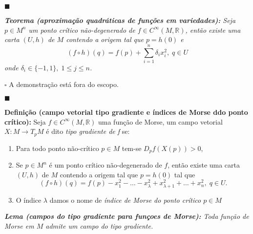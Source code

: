\documentclass{article}
\begin{document}
	$\blacksquare$
	
	\vspace{2mm}
	\textit{\textbf{Teorema (aproximação quadráticas de funções em variedades):} Seja $p \in M^{n}$ um ponto crítico não-degenerado de $f \in C^{\infty}(M, \mathbb{R})$, então existe uma carta $(U, h)$ de $M$ contendo a origem tal que $p = h(0)$ e 
		$$
		(f \circ h) (q) = f(p) + \sum_{i=1}^{n}\delta_{i}x_{i}^{2}, \; q \in U
		$$
		onde $\delta_{i} \in \{-1,1\}, \; 1\leq j \leq n$.}
	
	$\square$ A demonstração está fora do escopo.	
	
	$\blacksquare$
	
	\vspace{2mm}
	\textbf{Definição (campo vetorial tipo gradiente e índices de Morse ddo ponto crítico):} Seja $f \in C^{\infty}(M, \mathbb{R})$ uma função de Morse, um campo vetorial $X : M \to T_{p}M$ é dito \textit{tipo gradiente de f} se:
	\begin{enumerate}
		\item Para todo ponto não-crítico $p \in M$ tem-se 	
		$D_{p}f(X(p)) > 0$,
		
		\item Se $p \in M^{n}$ é um ponto crítico não-degenerado de $f$, então existe uma carta $(U, h)$ de $M$ contendo a origem tal que $p = h(0)$ tal que
		$$
		(f \circ h) (q) = f(p) - x_{1}^{2} - \dots - x_{\lambda}^{2} + x_{\lambda + 1}^{2} + \dots + x_{n}^{2}, \; q \in U.
		$$ 
		
		\item O índice $\lambda$ damos o nome de \textit{índice de Morse do ponto crítico $p \in M$}
	\end{enumerate}
	
	\vspace{2mm}
	\textit{\textbf{Lema (campos do tipo gradiente para funçoes de Morse):} Toda função de Morse em $M$ admite um campo do tipo gradiente.}
	
\end{document}

